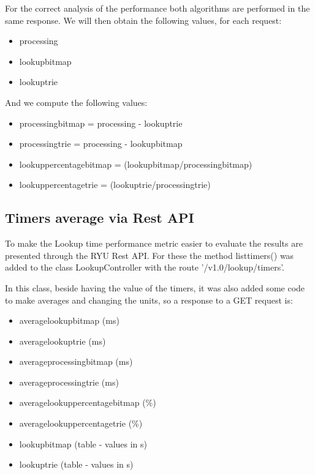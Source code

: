 \documentclass[]{report}
\begin{document}
For the correct analysis of the performance both algorithms are performed in the same response. We will then obtain the following values, for each request:

\begin{itemize}
\item processing
\item lookup\textunderscore bitmap
\item lookup\textunderscore trie
\end{itemize}




And we compute the following values:
\begin{itemize}
\item processing\textunderscore bitmap = processing - lookup\textunderscore trie
\item processing\textunderscore trie = processing  - lookup\textunderscore bitmap
\item lookup\textunderscore percentage\textunderscore bitmap = (lookup\textunderscore bitmap/processing\textunderscore bitmap)
\item lookup\textunderscore percentage\textunderscore trie = (lookup\textunderscore trie/processing\textunderscore trie)
\end{itemize} 



\subsection{Timers average via Rest API}
To make the Lookup time performance metric easier to evaluate the results are presented through the RYU Rest API. For these the method list\textunderscore timers() was added to the class LookupController with the route '/v1.0/lookup/timers'.

In this class, beside having the value of the timers, it was also added some code to make averages and changing the units, so a response to a GET request is:

\begin{itemize}
\item average\textunderscore lookup\textunderscore bitmap (ms)
\item average\textunderscore lookup\textunderscore trie (ms)
\item average\textunderscore processing\textunderscore bitmap (ms)
\item average\textunderscore processing\textunderscore trie (ms)
\item average\textunderscore lookup\textunderscore percentage\textunderscore bitmap (\%)
\item average\textunderscore lookup\textunderscore percentage\textunderscore trie (\%)
\item lookup\textunderscore bitmap (table - values in s)
\item lookup\textunderscore trie (table - values in s)
\end{itemize}
\end{document}
